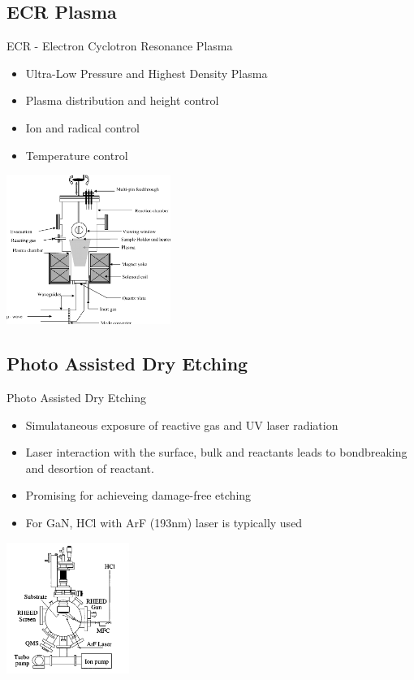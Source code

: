 \documentclass{beamer}
\begin{document}
\subsection{ECR Plasma}
\begin{frame}{ECR - Electron Cyclotron Resonance Plasma}

    \begin{itemize}
    \item
    Ultra-Low Pressure and Highest Density Plasma
      \pause
    \item
Plasma distribution and height control
      \pause
    \item
Ion and radical control
    \item
Temperature control
\end{itemize}

\begin{center}
\includegraphics[width=0.4\textwidth]{ECR.png}
\end{center}

\end{frame}


\subsection{Photo Assisted Dry Etching}
\begin{frame}{Photo Assisted Dry Etching}



    \begin{itemize}
    \item
Simulataneous exposure of reactive gas and UV laser radiation
 \pause
    \item
Laser interaction with the surface, bulk and reactants leads to bondbreaking and desortion of reactant.
\pause
    \item
Promising for achieveing damage-free etching
\item
For GaN, HCl with ArF (193nm) laser is typically used
\end{itemize}

\begin{center}
\includegraphics[width=0.3\textwidth]{photo.png}
\end{center}

\end{frame}
\end{document}
